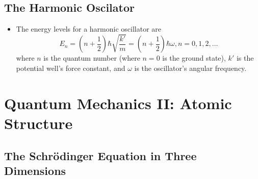 \documentclass{article}
\begin{document}
\subsection{The Harmonic Oscilator}

\begin{itemize}
  \item The energy levels for a harmonic oscillator are \[E_n = \left( n + \frac{1}{2} \right) \hbar \sqrt{\frac{k'}{m}} = \left( n + \frac{1}{2} \right) \hbar \omega, n = 0, 1, 2, \ldots\] where $n$ is the quantum number (where $n = 0$ is the ground state), $k'$ is the potential well's force constant, and $\omega$ is the oscillator's angular frequency.
\end{itemize}

\section{Quantum Mechanics II: Atomic Structure}

\subsection{The Schrödinger Equation in Three Dimensions}
\end{document}
